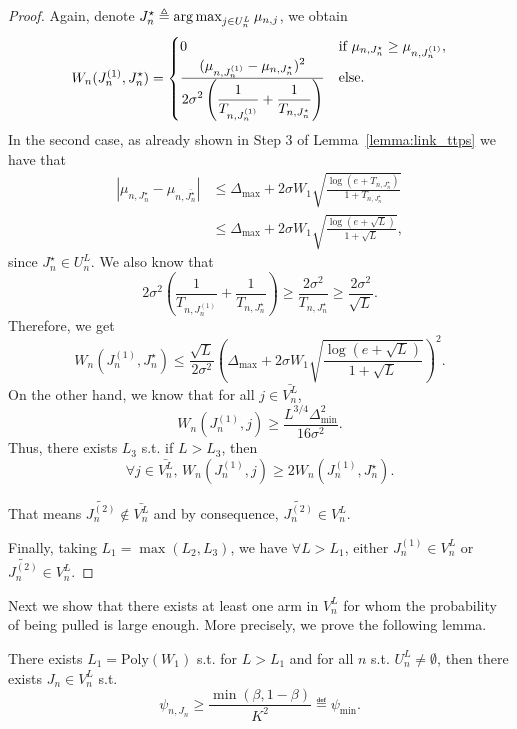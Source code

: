 \begin{proof}
    Again, denote $J_n^\star \triangleq \operatorname*{arg\,max}_{j\in U_n^L} \mu_{n,j}$, we obtain
    \begin{equation*}
        W_n(J_n^{(1)},J_n^\star) = \begin{cases}
        0 &\text{if } \mu_{n,J_n^\star}\geq\mu_{n,J_n^{(1)}}, \\
        \frac{\displaystyle (\mu_{n,J_n^{(1)}}-\mu_{n,J_n^\star})^2}{\displaystyle 2\sigma^2\left(\frac{1}{T_{n,J_n^{(1)}}}+\frac{1}{T_{n,J_n^\star}}\right)} &\text{else}.
        \end{cases}
    \end{equation*}
    In the second case, as already shown in Step 3 of Lemma~\ref{lemma:link_ttps} we have that
    \begin{align*}
        |\mu_{n,J_n^\star} - \mu_{n,\bar{J_n^\star}}| 
        &\leq \Delta_{\max} + 2\sigma W_1 \sqrt{\frac{\log(e+T_{n,J_n^\star})}{1+T_{n,J_n^\star}}}\\
        &\leq \Delta_{\max} + 2\sigma W_1 \sqrt{\frac{\log(e+\sqrt{L})}{1+\sqrt{L}}},
    \end{align*}
    since $J_n^\star \in U_n^L$. We also know that
    \[
        2\sigma^2\left(\frac{1}{T_{n,J_n^{(1)}}}+\frac{1}{T_{n,J_n^\star}}\right) \geq \frac{2\sigma^2}{T_{n,J_n^\star}} \geq \frac{2\sigma^2}{\sqrt{L}}.
    \]
    Therefore, we get
    \[
        W_n(J_n^{(1)},J_n^\star) \leq \frac{\sqrt{L}}{2\sigma^2}\left(\Delta_{\max} + 2\sigma W_1 \sqrt{\frac{\log(e+\sqrt{L})}{1+\sqrt{L}}}\right)^2.
    \]
    On the other hand, we know that for all $j\in\bar{V_n^L}$,
    \[
        W_n(J_n^{(1)},j) \geq \frac{L^{3/4}\Delta_{\text{min}}^2}{16\sigma^2}.
    \]
    Thus, there exists $L_3$ s.t. if $L>L_3$, then
    \[
        \forall j\in \bar{V_n^L},\, W_n(J_n^{(1)},j) \geq 2W_n(J_n^{(1)},J_n^\star).
    \]
    
    That means $\tilde{J_n^{(2)}}\notin \bar{V_n^L}$ and by consequence, $\tilde{J_n^{(2)}}\in V_n^L$.
    
    Finally, taking $L_1 = \max(L_2, L_3)$, we have $\forall L > L_1$, either $J_n^{(1)} \in V_n^L$ or $\tilde{J_n^{(2)}} \in V_n^L$.
\end{proof}

Next we show that there exists at least one arm in $V_n^L$ for whom the probability of being pulled is large enough. More precisely, we prove the following lemma.

\begin{lemma}\label{lemma:psi_min_t3c}
\begin{leftbar}[lemmabar]
    There exists $L_1 = \text{Poly}(W_1)$ s.t. for $L > L_1$ and for all $n$ s.t. $U_n^L \neq \emptyset$, then there exists $J_n \in V_n^L$ s.t.
    \[
        \psi_{n,J_n} \geq \frac{\min(\beta,1-\beta)}{K^2} \eqdef \psi_{\min}.
    \]
\end{leftbar}
\end{lemma}

